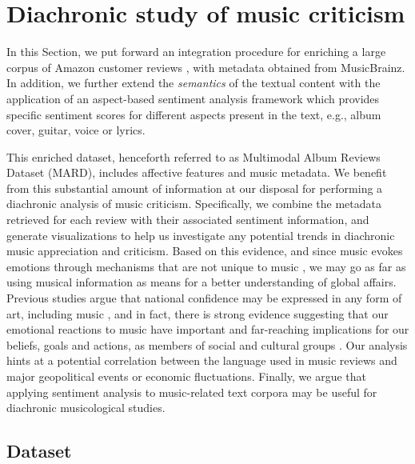 \section{Diachronic study of music criticism}
\label{sec:musicology:evolution}

In this Section, we put forward an integration procedure for enriching a large corpus of Amazon customer reviews \citep{McAuley2015a,mcauley2015image}, with metadata obtained from MusicBrainz. %
In addition, we further extend the \textit{semantics} of the textual content with the application of an aspect-based sentiment analysis framework \citep{DongSOS13} which provides specific sentiment scores for different aspects present in the text, e.g., album cover, guitar, voice or lyrics.

This enriched dataset, henceforth referred to as Multimodal Album Reviews Dataset (MARD), includes affective features and music metadata. %
We benefit from this substantial amount of information at our disposal for performing a diachronic analysis of music criticism. Specifically, we combine the metadata retrieved for each review with their associated sentiment information, and generate visualizations to help us investigate any potential trends in diachronic music appreciation and criticism. Based on this evidence, and since music evokes emotions through mechanisms that are not unique to music \citep{Juslin2008}, we may go as far as using musical information as means for a better understanding of global affairs. Previous studies argue that national confidence may be expressed in any form of art, including music \citep{Moisi2010}, and in fact, there is strong evidence suggesting that our emotional reactions to music have important and far-reaching implications for our beliefs, goals and actions, as members of social and cultural groups \citep{Alcorta2008}. Our analysis hints at a potential correlation between the language used in music reviews and major geopolitical events or economic fluctuations. Finally, we argue that applying sentiment analysis to music-related text corpora may be useful for diachronic musicological studies.


\subsection{Dataset}
\label{sec:musicology:mard}

